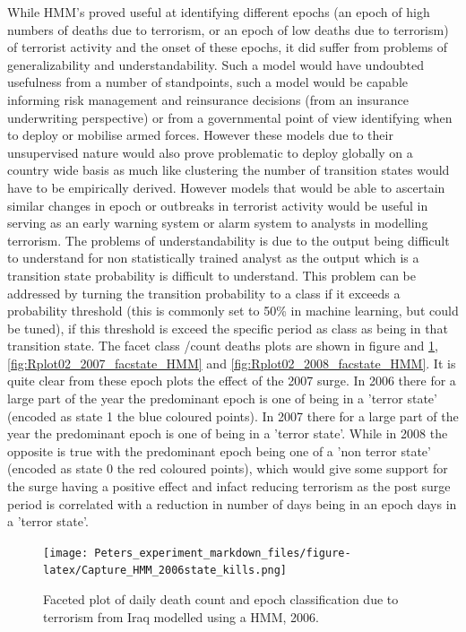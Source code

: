 While HMM's proved useful at identifying different epochs (an epoch of high numbers of deaths due to terrorism, or an epoch of low deaths due to terrorism) of terrorist activity and the onset of these epochs, it did suffer from problems of generalizability and understandability. Such a model would have undoubted usefulness from a number of standpoints, such a model would be capable informing risk management and reinsurance decisions (from an insurance underwriting perspective) or from a governmental point of view identifying when to deploy or mobilise armed forces. However these models due to their unsupervised nature would also prove problematic to deploy globally on a country wide basis as much like clustering the number of transition states would have to be empirically derived. However models that would be able to ascertain similar changes in epoch or outbreaks in terrorist activity would be useful in serving as an early warning system or alarm system to analysts in modelling terrorism. The problems of understandability is due to the output being difficult to understand for non statistically trained analyst as the output which is a transition state probability is difficult to understand. This problem can be addressed by turning the transition probability to a class if it exceeds a probability threshold (this is commonly set to 50\% in machine learning, but could be tuned), if this threshold is exceed the specific period as class as being in that transition state. The facet class /count deaths plots are shown in figure and \ref{fig:Rplot02_2006_facstate_HMM},\ref{fig:Rplot02_2007_facstate_HMM} and \ref{fig:Rplot02_2008_facstate_HMM}. It is quite clear from these epoch plots the effect of the 2007 surge. In 2006 there for a large part of the year the predominant epoch is one of being in a 'terror state' (encoded as state 1 the blue coloured points). In 2007 there for a large part of the year the predominant epoch is one of being in a 'terror state'. While in 2008 the opposite is true with the predominant epoch being one of a 'non terror state' (encoded as state 0 the red coloured points), which would give some support for the  surge having a positive effect and infact reducing terrorism as the post surge period is correlated with a reduction in number of days being in an epoch days in a 'terror state'.

\begin{figure}[t]
\texttt{[image: Peters\_experiment\_markdown\_files/figure-latex/Capture\_HMM\_2006state\_kills.png]}
\caption{Faceted plot of daily death count and epoch classification due to terrorism from Iraq modelled using a HMM, 2006.}
\label{fig:Rplot02_2006_facstate_HMM}
\centering
\end{figure}


